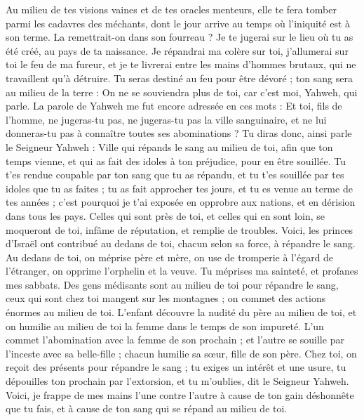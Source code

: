 \begin{multicols}{2}
Au milieu de tes visions vaines et de tes oracles menteurs, elle te fera tomber parmi les cadavres des méchants, dont le jour arrive au temps où l’iniquité est à son terme.
La remettrait-on dans son fourreau ? Je te jugerai sur le lieu où tu as été créé, au pays de ta naissance.
Je répandrai ma colère sur toi, j'allumerai sur toi le feu de ma fureur, et je te livrerai entre les mains d'hommes brutaux,  qui ne travaillent qu’à détruire\FTNT{}.
Tu seras destiné au feu pour être dévoré ; ton sang sera au milieu de la terre : On ne se souviendra plus de toi, car c'est moi, Yahweh, qui parle.
\VerseOne{}La parole de Yahweh me fut encore adressée en ces mots :
Et toi, fils de l’homme, ne jugeras-tu pas, ne jugeras-tu pas la ville sanguinaire, et ne lui donneras-tu pas à connaître toutes ses abominations\FTNT{} ?
Tu diras donc, ainsi parle le Seigneur Yahweh : Ville qui répands le sang au milieu de toi, afin que ton temps vienne, et qui as fait des idoles à ton préjudice, pour en être souillée.
Tu t'es rendue coupable par ton sang que tu as répandu, et tu t'es souillée par tes idoles que tu as faites ; tu as fait approcher tes jours, et tu es venue au terme de tes années ; c'est pourquoi je t'ai exposée en opprobre aux nations, et en dérision dans tous les pays\FTNT{}.
Celles qui sont près de toi, et celles qui en sont loin, se moqueront de toi, infâme de réputation, et remplie de troubles.
Voici, les princes d'Israël ont contribué au dedans de toi, chacun selon sa force, à répandre le sang.
Au dedans de toi, on méprise père et mère, on use de tromperie à l'égard de l'étranger, on opprime l'orphelin et la veuve.
Tu méprises ma sainteté, et profanes mes sabbats.
Des gens médisants sont au milieu de toi pour répandre le sang, ceux qui sont chez toi mangent sur les montagnes ; on commet des actions énormes au milieu de toi\FTNT{}.
L'enfant découvre la nudité du père au milieu de toi, et on humilie au milieu de toi la femme dans le temps de son impureté\FTNT{}.
L'un commet l’abomination avec la femme de son prochain ; et l'autre se souille par l’inceste avec sa belle-fille ; chacun  humilie sa sœur, fille de son père\FTNT{}.
Chez toi, on reçoit des présents pour répandre le sang ; tu exiges un intérêt et une usure, tu dépouilles ton prochain par l’extorsion, et tu m’oublies, dit le Seigneur Yahweh\FTNT{}.
Voici, je frappe de mes mains l'une contre l'autre à cause de ton gain déshonnête que tu fais, et à cause de ton sang qui se répand au milieu de toi.

\end{multicols}
